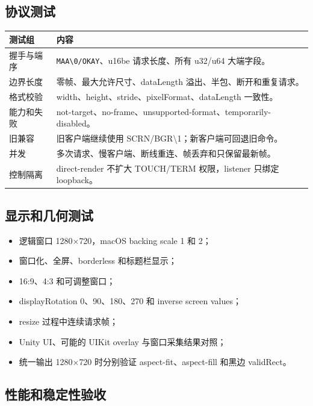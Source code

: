 \documentclass[UTF8,a4paper,11pt]{ctexart}
\begin{document}
\subsection{协议测试}

\begin{center}
\small
\begin{tabularx}{\textwidth}{>{\raggedright\arraybackslash}p{} X}
\toprule
测试组 & 内容 \\
\midrule
握手与端序 & \texttt{MAA\textbackslash{}0/OKAY}、u16be 请求长度、所有 u32/u64 大端字段。\\
边界长度 & 零帧、最大允许尺寸、dataLength 溢出、半包、断开和重复请求。\\
格式校验 & width、height、stride、pixelFormat、dataLength 一致性。\\
能力和失败 & not-target、no-frame、unsupported-format、temporarily-disabled。\\
旧兼容 & 旧客户端继续使用 SCRN/BGR\textbackslash{}1；新客户端可回退旧命令。\\
并发 & 多次请求、慢客户端、断线重连、帧丢弃和只保留最新帧。\\
控制隔离 & direct-render 不扩大 TOUCH/TERM 权限，listener 只绑定 loopback。\\
\bottomrule
\end{tabularx}
\end{center}

\subsection{显示和几何测试}

\begin{itemize}
  \item 逻辑窗口 1280\(\times\)720，macOS backing scale 1 和 2；
  \item 窗口化、全屏、borderless 和标题栏显示；
  \item 16:9、4:3 和可调整窗口；
  \item displayRotation 0、90、180、270 和 inverse screen values；
  \item resize 过程中连续请求帧；
  \item Unity UI、可能的 UIKit overlay 与窗口采集结果对照；
  \item 统一输出 1280\(\times\)720 时分别验证 aspect-fit、aspect-fill 和黑边 validRect。
\end{itemize}

\subsection{性能和稳定性验收}
\end{document}
